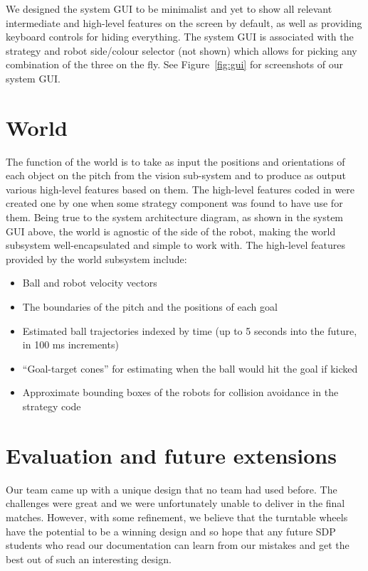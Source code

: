 \documentclass[12pt,a4paper,notitlepage,twocolumn]{report}
\begin{document}
We designed the system GUI to be minimalist and yet to show all
relevant intermediate and high-level features on the screen by
default, as well as providing keyboard controls for hiding everything.
The system GUI is associated with the strategy and robot side/colour
selector (not shown) which allows for picking any combination of the
three on the fly. See Figure~\ref{fig:gui} for screenshots of our
system GUI.

\section*{World}
The function of the world is to take as input the positions and
orientations of each object on the pitch from the vision sub-system
and to produce as output various high-level features based on them.
The high-level features coded in were created one by one when some
strategy component was found to have use for them. Being true to the
system architecture diagram, as shown in the system GUI above, the
world is agnostic of the side of the robot, making the world subsystem
well-encapsulated and simple to work with. The high-level features
provided by the world subsystem include:

\begin{itemize}
\item Ball and robot velocity vectors
\item The boundaries of the pitch and the positions of each goal
\item Estimated ball trajectories indexed by time (up to 5 seconds
  into the future, in 100 ms increments)
\item “Goal-target cones” for estimating when the ball would hit the
  goal if kicked
\item Approximate bounding boxes of the robots for collision avoidance
  in the strategy code
\end{itemize}

\section*{Evaluation and future extensions}

Our team came up with a unique design that no team had used before.
The challenges were great and we were unfortunately unable to deliver
in the final matches. However, with some refinement, we believe that
the turntable wheels have the potential to be a winning design and so
hope that any future SDP students who read our documentation can learn
from our mistakes and get the best out of such an interesting design.
\end{document}
